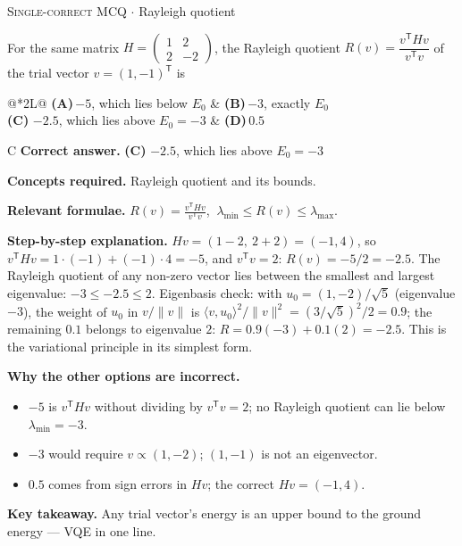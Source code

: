 \documentclass[11pt,a4paper]{article}
\newcommand{\optlabel}[1]{\textbf{(#1)}}
\newcommand{\correctlabel}[1]{\textcolor{okgreen}{\textbf{(#1)}\,\ding{51}}}
\newenvironment{qitem}[1]{\begin{list}{}{\setlength{\leftmargin}{3.3em}\setlength{\labelwidth}{3.1em}%
  \setlength{\labelsep}{0.2em}\setlength{\topsep}{3pt}\setlength{\parsep}{3pt}}\item[\textbf{Q.#1}\hfill]}{\end{list}}
\newcommand{\qsep}{\par\vspace{2pt}{\color{black!15}\hrule}\vspace{4pt}}
\newcommand{\qmeta}[2]{{\footnotesize\color{black!60}\textsc{#1} \;$\cdot$\; #2}\par}
\begin{document}
\begin{qitem}{2}
\qmeta{Single-correct MCQ}{Rayleigh quotient}
For the same matrix $H = \begin{pmatrix}1 & 2\\ 2 & -2\end{pmatrix}$, the Rayleigh quotient $R(v) = \dfrac{v^{\mathsf T}Hv}{v^{\mathsf T}v}$ of the trial
vector $v = (1, -1)^{\mathsf T}$ is
\par\smallskip\noindent\begin{tabularx}{\linewidth}{@{}*{2}{L}@{}}
\optlabel{A}\,$-5$, which lies below $E_0$ & \optlabel{B}\,$-3$, exactly $E_0$ \\[3pt]
\correctlabel{C}\,$-2.5$, which lies above $E_0 = -3$ & \optlabel{D}\,$0.5$
\end{tabularx}
\end{qitem}
\begin{solbox}{C}
\textbf{\color{brand}Correct answer.} \textcolor{okgreen}{\textbf{(C)}} $-2.5$, which lies above $E_0 = -3$

\textbf{\color{brand}Concepts required.} Rayleigh quotient and its bounds.

\textbf{\color{brand}Relevant formulae.} $R(v) = \frac{v^{\mathsf T}Hv}{v^{\mathsf T}v}$, $\ \lambda_{\min} \le R(v) \le \lambda_{\max}$.

\textbf{\color{brand}Step-by-step explanation.} $Hv = (1 - 2,\ 2 + 2) = (-1, 4)$, so $v^{\mathsf T}Hv = 1\cdot(-1) + (-1)\cdot4 = -5$, and $v^{\mathsf T}v = 2$: $R(v) = -5/2 = -2.5$.
The Rayleigh quotient of any non-zero vector lies between the smallest and largest eigenvalue: $-3 \le -2.5 \le 2$.
Eigenbasis check: with $u_0 = (1, -2)/\sqrt5$ (eigenvalue $-3$), the weight of $u_0$ in $v/\|v\|$ is $\langle v, u_0\rangle^2/\|v\|^2 = (3/\sqrt5)^2/2 = 0.9$;
the remaining $0.1$ belongs to eigenvalue $2$: $R = 0.9(-3) + 0.1(2) = -2.5$. This is the variational principle in its simplest form.

\textbf{\color{brand}Why the other options are incorrect.}
\begin{itemize}[leftmargin=2.4em, itemsep=1pt, topsep=2pt]
\item[\textbf{(A)}] $-5$ is $v^{\mathsf T}Hv$ without dividing by $v^{\mathsf T}v = 2$; no Rayleigh quotient can lie below $\lambda_{\min} = -3$.
\item[\textbf{(B)}] $-3$ would require $v \propto (1, -2)$; $(1, -1)$ is not an eigenvector.
\item[\textbf{(D)}] $0.5$ comes from sign errors in $Hv$; the correct $Hv = (-1, 4)$.
\end{itemize}
\textbf{\color{brand}Key takeaway.} Any trial vector's energy is an upper bound to the ground energy --- VQE in one line.
\end{solbox}
\qsep
\end{document}
